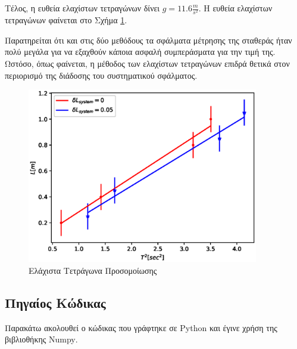\documentclass[assignment1.tex]{subfiles}
\begin{document}
Τέλος, η ευθεία ελαχίστων τετραγώνων δίνει $g=11.6\frac{m}{s^2}$. Η ευθεία ελαχίστων τετραγώνων φαίνεται στο Σχήμα \ref{fig:least_squares}.

Παρατηρείται ότι και στις δύο μεθόδους τα σφάλματα μέτρησης της σταθεράς ήταν πολύ μεγάλα για να εξαχθούν κάποια ασφαλή συμπεράσματα για την τιμή της. Ωστόσο, όπως φαίνεται, η μέθοδος των ελαχίστων τετραγώνων επιδρά θετικά στον περιορισμό της διάδοσης του συστηματικού σφάλματος.

\begin{figure}[hp]
\includegraphics[width=0.9\textwidth]{experiment.eps}
\centering
\caption{Ελάχιστα Τετράγωνα Προσομοίωσης}
\label{fig:least_squares}
\end{figure} 

\FloatBarrier

\subsection{Πηγαίος Κώδικας}

Παρακάτω ακολουθεί ο κώδικας που γράφτηκε σε \textlatin{Python} και έγινε χρήση της βιβλιοθήκης \textlatin{Numpy}.


\end{document}
